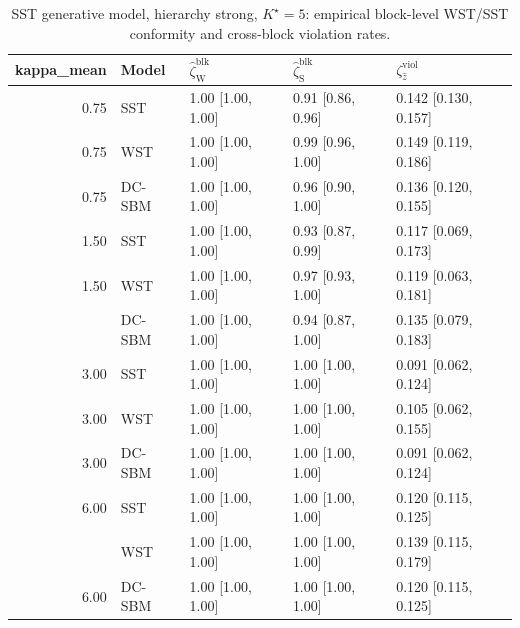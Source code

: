 \begin{table}
\centering
\caption{SST generative model, hierarchy strong, $K^\star=5$: empirical block-level WST/SST conformity and cross-block violation rates.}
\centering
\begin{tabular}[t]{rllll}
\toprule
kappa_mean & Model & $\widehat\zeta_{\mathrm{W}}^{\mathrm{blk}}$ & $\widehat\zeta_{\mathrm{S}}^{\mathrm{blk}}$ & $\zeta^{\mathrm{viol}}_{\hat z}$\\
\midrule
0.75 & SST & 1.00 [1.00, 1.00] & 0.91 [0.86, 0.96] & 0.142 [0.130, 0.157]\\
0.75 & WST & 1.00 [1.00, 1.00] & 0.99 [0.96, 1.00] & 0.149 [0.119, 0.186]\\
0.75 & DC-SBM & 1.00 [1.00, 1.00] & 0.96 [0.90, 1.00] & 0.136 [0.120, 0.155]\\
1.50 & SST & 1.00 [1.00, 1.00] & 0.93 [0.87, 0.99] & 0.117 [0.069, 0.173]\\
1.50 & WST & 1.00 [1.00, 1.00] & 0.97 [0.93, 1.00] & 0.119 [0.063, 0.181]\\
\addlinespace
1.50 & DC-SBM & 1.00 [1.00, 1.00] & 0.94 [0.87, 1.00] & 0.135 [0.079, 0.183]\\
3.00 & SST & 1.00 [1.00, 1.00] & 1.00 [1.00, 1.00] & 0.091 [0.062, 0.124]\\
3.00 & WST & 1.00 [1.00, 1.00] & 1.00 [1.00, 1.00] & 0.105 [0.062, 0.155]\\
3.00 & DC-SBM & 1.00 [1.00, 1.00] & 1.00 [1.00, 1.00] & 0.091 [0.062, 0.124]\\
6.00 & SST & 1.00 [1.00, 1.00] & 1.00 [1.00, 1.00] & 0.120 [0.115, 0.125]\\
\addlinespace
6.00 & WST & 1.00 [1.00, 1.00] & 1.00 [1.00, 1.00] & 0.139 [0.115, 0.179]\\
6.00 & DC-SBM & 1.00 [1.00, 1.00] & 1.00 [1.00, 1.00] & 0.120 [0.115, 0.125]\\
\bottomrule
\end{tabular}
\end{table}
